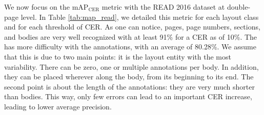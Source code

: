 We now focus on the $\mathrm{mAP}_\mathrm{CER}$ metric with the READ 2016 dataset at double-page level. In Table \ref{tab:map_read}, we detailed this metric for each layout class and for each threshold of CER. As one can notice, pages, page numbers, sections, and bodies are very well recognized with at least 91\% for a CER as of 10\%. The \modelacc{} has more difficulty with the annotations, with an average of 80.28\%. We assume that this is due to two main points: it is the layout entity with the most variability. There can be zero, one or multiple annotations per body. In addition, they can be placed wherever along the body, from its beginning to its end. The second point is about the length of the annotations: they are very much shorter than bodies. This way, only few errors can lead to an important CER increase, leading to lower average precision.
\begin{table*}[ht]
    \caption{$\mathrm{mAP}_\mathrm{CER}$ detailed for each class and each CER threshold, for the READ 2016 double-page dataset.}
    \centering
    \label{tab:map_read}
\end{table*}

